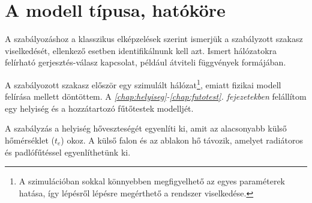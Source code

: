  


\section*{A modell típusa, hatóköre}

A szabályozáshoz a klasszikus elképzelések szerint ismerjük a szabályzott szakasz viselkedését, ellenkező esetben identifikálnunk kell azt. Ismert hálózatokra felírható gerjesztés-válasz kapcsolat, például átviteli függvények formájában. %

A szabályozott szakasz először egy szimulált hálózat\footnote{A szimulációban sokkal könnyebben megfigyelhető az egyes paraméterek hatása, így lépésről lépésre megérthető a rendszer viselkedése.}, emiatt fizikai modell felírása mellett döntöttem. A \textit{\ref{chap:helyiseg}-\ref{chap:futotest}. fejezetekben} felállítom egy helyiség és a hozzátartozó fűtőtestek modelljét. %


A szabályzás a helyiség hőveszteségét egyenlíti ki, amit az alacsonyabb külső hőmérséklet ($t_e$) okoz. A külső falon és az ablakon hő távozik, amelyet radiátoros és padlófűtéssel egyenlíthetünk ki.

%
%
%
%

%
